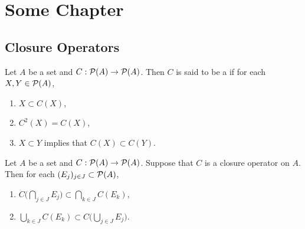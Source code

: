 \documentclass{book}
\begin{document}
	
	
	
	
	
	
	
	
	
	
	
	
	
	
	
	
	
	
	
	
	
	
	
	
	
	
	
	
	
	
	
	
	
	\newpage
	\chapter{Some Chapter}
	
	\section{Closure Operators}
	
	\begin{defn}
		Let $A$ be a set and $C: \mathcal{P}(A) \rightarrow \mathcal{P}(A)$. Then $C$ is said to be a  if for each $X, Y \in \mathcal{P}(A)$,
		\begin{enumerate}
			\item $X \subset C(X)$,
			\item $C^2(X) = C(X)$,
			\item $X \subset Y$ implies that $C(X) \subset C(Y)$.
		\end{enumerate}
	\end{defn}

	\begin{ex}
		Let $A$ be a set and $C: \mathcal{P}(A) \rightarrow \mathcal{P}(A)$. Suppose that $C$ is a closure operator on $A$. Then for each $(E_j)_{j \in J} \subset \mathcal{P}(A)$,
		\begin{enumerate}
			\item $C \bigg( \bigcap\limits_{j \in J} E_j \bigg) \subset \bigcap\limits_{k \in J} C(E_k)$,
			\item $\bigcup\limits_{k \in J} C(E_k) \subset C \bigg( \bigcup\limits_{j \in J} E_j \bigg)$.
		\end{enumerate}
	\end{ex}
\end{document}
